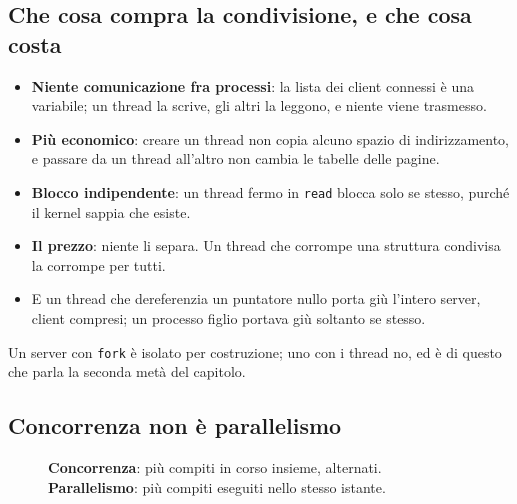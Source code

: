 \subsection{Che cosa compra la condivisione, e che cosa costa}

\begin{itemize}
    \item \textbf{Niente comunicazione fra processi}: la lista dei client connessi è una variabile; un thread la scrive, gli
          altri la leggono, e niente viene trasmesso.
    \item \textbf{Più economico}: creare un thread non copia alcuno spazio di indirizzamento, e passare da un thread all'altro
          non cambia le tabelle delle pagine.
    \item \textbf{Blocco indipendente}: un thread fermo in \texttt{read} blocca solo se stesso, purché il kernel sappia che
          esiste.
    \item \textbf{Il prezzo}: niente li separa. Un thread che corrompe una struttura condivisa la corrompe per tutti.
    \item E un thread che dereferenzia un puntatore nullo porta giù l'intero server, client compresi; un processo figlio
          portava giù soltanto se stesso.
\end{itemize}

Un server con \texttt{fork} è isolato per costruzione; uno con i thread no, ed è di questo che parla la seconda metà del
capitolo.

\subsection{Concorrenza non è parallelismo}

\begin{figure}[H]
\centering
{}
\caption{\textbf{Concorrenza}: più compiti in corso insieme, alternati. \textbf{Parallelismo}: più compiti eseguiti nello
         stesso istante.}
\end{figure}


